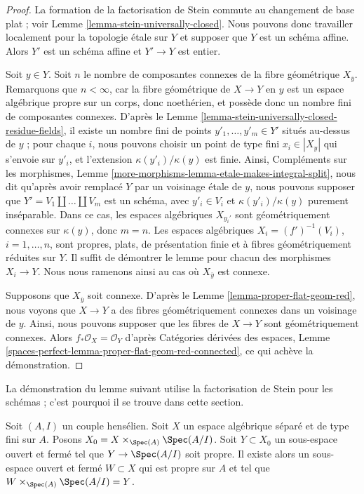 \begin{proof}
La formation de la factorisation de Stein commute au changement de base plat ;
voir Lemme \ref{lemma-stein-universally-closed}.
Nous pouvons donc travailler localement pour la topologie étale sur $Y$ et supposer que $Y$
est un schéma affine. Alors $Y'$ est un schéma affine et $Y' \to Y$
est entier.

\medskip\noindent
Soit $y \in Y$. Soit $n$ le nombre de composantes connexes de
la fibre géométrique $X_{\overline{y}}$. Remarquons que $n < \infty$,
car la fibre géométrique de $X \to Y$ en $y$ est un espace
algébrique propre sur un corps, donc noethérien,
et possède donc un nombre fini de composantes connexes.
D'après le Lemme \ref{lemma-stein-universally-closed-residue-fields},
il existe un nombre fini de points $y'_1, \ldots, y'_m \in Y'$ situés au-dessus de $y$ ;
pour chaque $i$, nous pouvons choisir un point de type fini $x_i \in |X_y|$
qui s'envoie sur $y'_i$, et l'extension $\kappa(y'_i)/\kappa(y)$ est finie.
Ainsi, Compléments sur les morphismes,
Lemme \ref{more-morphisms-lemma-etale-makes-integral-split},
nous dit qu'après avoir remplacé $Y$ par un voisinage étale
de $y$, nous pouvons supposer que $Y' = V_1 \amalg \ldots \amalg V_m$ est un schéma,
avec $y'_i \in V_i$ et $\kappa(y'_i)/\kappa(y)$ purement inséparable.
Dans ce cas, les espaces algébriques $X_{y_i'}$
sont géométriquement connexes sur $\kappa(y)$, donc $m = n$.
Les espaces algébriques $X_i = (f')^{-1}(V_i)$, $i = 1, \ldots, n$,
sont propres, plats, de présentation finie et à fibres géométriquement
réduites sur $Y$. Il suffit de démontrer le lemme
pour chacun des morphismes $X_i \to Y$. Nous nous ramenons ainsi au cas où
$X_{\overline{y}}$ est connexe.

\medskip\noindent
Supposons que $X_{\overline{y}}$ soit connexe. D'après le
Lemme \ref{lemma-proper-flat-geom-red},
nous voyons que $X \to Y$ a des fibres géométriquement connexes
dans un voisinage de $y$. Ainsi,
nous pouvons supposer que les fibres de $X \to Y$ sont géométriquement connexes.
Alors $f_*\mathcal{O}_X = \mathcal{O}_Y$ d'après
Catégories dérivées des espaces, Lemme
\ref{spaces-perfect-lemma-proper-flat-geom-red-connected},
ce qui achève la démonstration.
\end{proof}

\noindent
La démonstration du lemme suivant utilise la factorisation de Stein pour les schémas ;
c'est pourquoi il se trouve dans cette section.

\begin{lemma}
\label{lemma-split-off-proper-part-henselian}
Soit $(A, I)$ un couple hensélien. Soit $X$ un espace algébrique
séparé et de type fini sur $A$. Posons
$X_0 = X \times_{\Spec(A)} \Spec(A/I)$.
Soit $Y \subset X_0$ un sous-espace ouvert et fermé tel que
$Y \to \Spec(A/I)$ soit propre. Il existe alors un sous-espace ouvert et fermé
$W \subset X$ qui est propre sur $A$ et tel que
$W \times_{\Spec(A)} \Spec(A/I) = Y$.
\end{lemma}

